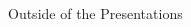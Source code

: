 \documentclass[17pt,dvipdfmx]{beamer}
\begin{document}
\begin{frame}[t]{Outside of the Presentations}
\begin{itemize}
\begin{columns}[t]
\begin{column}{.4\textwidth}
      \end{column}
      \begin{column}{.7\textwidth}
      \vspace{-33pt}
        \begin{columns}[t]
\end{columns}
\end{column}
\end{columns}
\end{itemize}
\end{frame}
\end{document}
